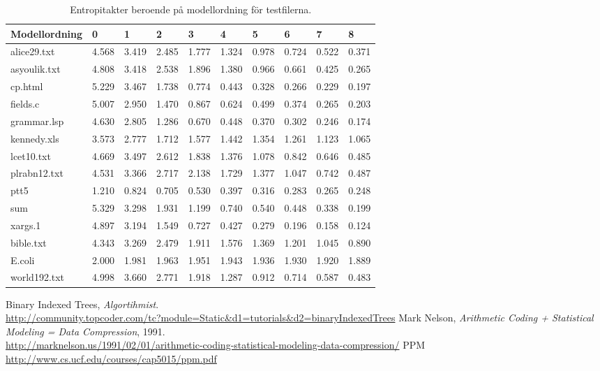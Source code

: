 \documentclass[a4paper,11pt]{article}
\begin{document}
\begin{table}[h!]
  \label{entropitakt}
  \caption{Entropitakter beroende på modellordning för testfilerna.}
  \begin{tabular}[h]{|l|l|l|l|l|l|l|l|l|l|}
    \hline
    Modellordning & 0     & 1     & 2     & 3     & 4     & 5     & 6     & 7     & 8\\
    \hline
    alice29.txt   & 4.568 & 3.419 & 2.485 & 1.777 & 1.324 & 0.978 & 0.724 & 0.522 & 0.371 \\ 
    asyoulik.txt  & 4.808 & 3.418 & 2.538 & 1.896 & 1.380 & 0.966 & 0.661 & 0.425 & 0.265 \\ 
    cp.html       & 5.229 & 3.467 & 1.738 & 0.774 & 0.443 & 0.328 & 0.266 & 0.229 & 0.197 \\ 
    fields.c      & 5.007 & 2.950 & 1.470 & 0.867 & 0.624 & 0.499 & 0.374 & 0.265 & 0.203 \\ 
    grammar.lsp   & 4.630 & 2.805 & 1.286 & 0.670 & 0.448 & 0.370 & 0.302 & 0.246 & 0.174 \\ 
    kennedy.xls   & 3.573 & 2.777 & 1.712 & 1.577 & 1.442 & 1.354 & 1.261 & 1.123 & 1.065 \\ 
    lcet10.txt    & 4.669 & 3.497 & 2.612 & 1.838 & 1.376 & 1.078 & 0.842 & 0.646 & 0.485 \\ 
    plrabn12.txt  & 4.531 & 3.366 & 2.717 & 2.138 & 1.729 & 1.377 & 1.047 & 0.742 & 0.487 \\ 
    ptt5          & 1.210 & 0.824 & 0.705 & 0.530 & 0.397 & 0.316 & 0.283 & 0.265 & 0.248 \\ 
    sum           & 5.329 & 3.298 & 1.931 & 1.199 & 0.740 & 0.540 & 0.448 & 0.338 & 0.199 \\ 
    xargs.1       & 4.897 & 3.194 & 1.549 & 0.727 & 0.427 & 0.279 & 0.196 & 0.158 & 0.124 \\ 
    bible.txt     & 4.343 & 3.269 & 2.479 & 1.911 & 1.576 & 1.369 & 1.201 & 1.045 & 0.890 \\ 
    E.coli        & 2.000 & 1.981 & 1.963 & 1.951 & 1.943 & 1.936 & 1.930 & 1.920 & 1.889 \\ 
    world192.txt  & 4.998 & 3.660 & 2.771 & 1.918 & 1.287 & 0.912 & 0.714 & 0.587 & 0.483 \\ 
    \hline
  \end{tabular}
\end{table}

\cite{fenwick}
\clearpage
\begin{thebibliography}{9}
    Binary Indexed Trees,
    \emph{Algortihmist}.\\
    \url{http://community.topcoder.com/tc?module=Static\&d1=tutorials\&d2=binaryIndexedTrees}
    Mark Nelson,
    \emph{Arithmetic Coding + Statistical Modeling = Data Compression}, 1991.\\
    \url{http://marknelson.us/1991/02/01/arithmetic-coding-statistical-modeling-data-compression/}
    PPM
    \url{http://www.cs.ucf.edu/courses/cap5015/ppm.pdf}

\end{thebibliography}
\end{document}
